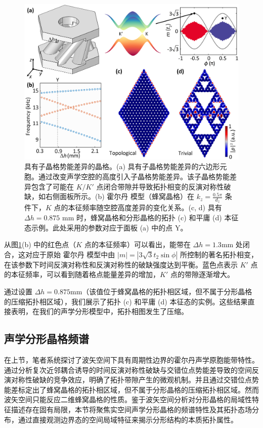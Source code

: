 \begin{figure}[htbp]
    \centering
    \includegraphics[width=0.75\linewidth]{figure/FracHaldExp/ComsolMass.png}
    \caption{具有子晶格势能差异的晶格。(a) 具有子晶格势能差异的六边形元胞。通过改变声学空腔的高度引入子晶格势能差异。该子晶格势能差异包含了可能在 $K/K'$ 点闭合带隙并导致拓扑相变的反演对称性破缺，如右侧面板所示。(b) 霍尔丹 模型（蜂窝晶格）在 $k_z = \frac{0.5\pi}{d_z}$ 条件下，$K$ 点的本征频率随空腔高度差异的变化关系。(c, d) 具有 $\Delta h = 0.875$ mm 时，蜂窝晶格和分形晶格的拓扑 (c) 和平庸 (d) 本征态示例。此处采用的参数对应于面板 (a) 中的点 Y。}
    \label{fig:ComsolMass}
\end{figure}

从图\ref{fig:ComsolMass}(b) 中的红色点（$K$ 点的本征频率）可以看出，能带在 $\Delta h = 1.3$mm 处闭合，这对应于原始 霍尔丹 模型中由 $|m| = |3\sqrt{3}t_2 \sin\phi|$ 所控制的著名拓扑相变，在该参数下时间反演对称性和反演对称性的破缺强度达到平衡。蓝色点表示 $K'$ 点的本征频率，可以看到随着格点能量差异的增加，$K'$ 点的带隙逐渐增大。

通过设置 $\Delta h = 0.875$mm（该值位于蜂窝晶格的拓扑相区域，但不属于分形晶格的压缩拓扑相区域），我们展示了拓扑 (c) 和平庸 (d) 本征态的实例。这些结果直接表明，在我们的声学分形模型中，拓扑相图发生了压缩。

\subsection{声学分形晶格频谱}
在上节，笔者系统探讨了波矢空间下具有周期性边界的霍尔丹声学原胞能带特性。通过分析复次近邻耦合诱导的时间反演对称性破缺与交错位点势能差导致的空间反演对称性破缺的竞争效应，明确了拓扑带隙产生的微观机制。并且通过交错位点势能差标定出了蜂窝晶格的拓扑相区域，但不属于分形晶格的压缩拓扑相区域。然而波矢空间只能反应二维蜂窝晶格的性质。鉴于波矢空间分析对分形晶格的局域性特征描述存在固有局限，本节将聚焦实空间声学分形晶格的频谱特性及其拓扑态场分布，通过直接观测边界态的空间局域特征来揭示分形结构的本质拓扑属性。


